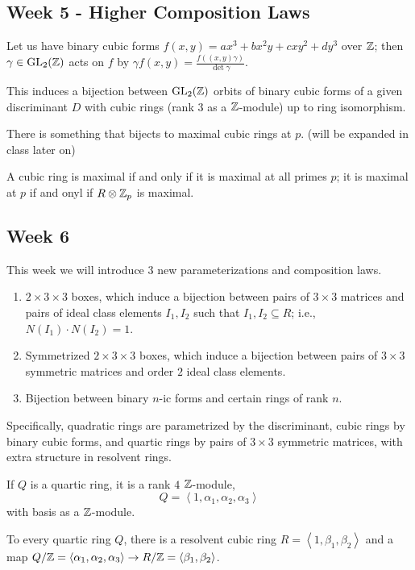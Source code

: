 \subsection{Week 5 - Higher Composition Laws}
\begin{simplethm}
    Let us have binary cubic forms $f(x, y) = ax^3 + bx^2y + cxy^2 + dy^3$ over $\mathbb Z$; then $\gamma \in \operatorname{GL}_2(\mathbb Z)$ acts on $f$ by $\gamma f(x, y) = \frac{f((x, y) \gamma)}{\det \gamma}$.
\end{simplethm}
\noindent This induces a bijection between $\operatorname{GL}_2(\mathbb Z)$ orbits of binary cubic forms of a given discriminant $D$ with cubic rings (rank $3$ as a $\mathbb Z$-module) up to ring isomorphism.

\begin{simplethm}
    There is something that bijects to maximal cubic rings at $p$. (will be expanded in class later on)
\end{simplethm}
\noindent A cubic ring is maximal if and only if it is maximal at all primes $p$; it is maximal at $p$ if and onyl if $R \otimes \mathbb Z_p$ is maximal.

\subsection{Week 6}
This week we will introduce $3$ new parameterizations and composition laws.
\begin{enumerate}
    \item $2 \times 3 \times 3$ boxes, which induce a bijection between pairs of $3 \times 3$ matrices and pairs of ideal class elements $I_1, I_2$ such that $I_1, I_2 \subseteq R$; i.e., $N(I_1) \cdot N(I_2) = 1$.
    \item Symmetrized $2 \times 3 \times 3$ boxes, which induce a bijection between pairs of $3 \times 3$ symmetric matrices and order $2$ ideal class elements.
    \item Bijection between binary $n$-ic forms and certain rings of rank $n$.
\end{enumerate}
Specifically, quadratic rings are parametrized by the discriminant, cubic rings by binary cubic forms, and quartic rings by pairs of $3 \times 3$ symmetric matrices, with extra structure in resolvent rings.

\noindent If $Q$ is a quartic ring, it is a rank $4$ $\mathbb Z$-module,
\[ Q = \left< 1, \alpha_1, \alpha_2, \alpha_3 \right> \]
with basis as a $\mathbb Z$-module.
\begin{simplethm}
    To every quartic ring $Q$, there is a resolvent cubic ring $R = \left< 1, \beta_1, \beta_2 \right>$ and a map $Q / \mathbb Z = \left< \alpha_1, \alpha_2, \alpha_3 \right> \to R / \mathbb Z = \left< \beta_1, \beta_2 \right>$.
\end{simplethm}

